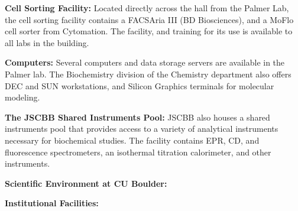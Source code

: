   {\bf Cell Sorting Facility:} Located directly across the hall from the Palmer Lab, the cell sorting facility contains a FACSAria III (BD Biosciences), and a MoFlo cell sorter from Cytomation. The facility, and training for its use is available to all labs in the building.

  {\bf Computers:} Several computers and data storage servers are available in the Palmer lab. The Biochemistry division of the Chemistry department also offers DEC and SUN workstations, and Silicon Graphics terminals for molecular modeling.

  {\bf The JSCBB Shared Instruments Pool:} JSCBB also houses a shared instruments pool that provides access to a variety of analytical instruments necessary for biochemical studies. The facility contains EPR, CD, and fluorescence spectrometers, an isothermal titration calorimeter, and other instruments.

  {\bf Scientific Environment at CU Boulder:} %

  {\bf Institutional Facilities:}

